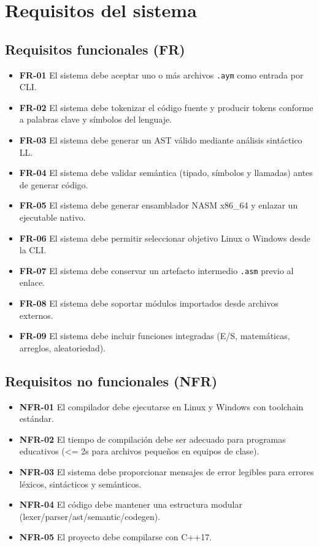 \documentclass[11pt,a4paper]{article}
\begin{document}
\section{Requisitos del sistema}

\subsection{Requisitos funcionales (FR)}
\begin{itemize}
    \item \textbf{FR-01} El sistema debe aceptar uno o más archivos \texttt{.aym} como entrada por CLI.
    \item \textbf{FR-02} El sistema debe tokenizar el código fuente y producir tokens conforme a palabras clave y símbolos del lenguaje.
    \item \textbf{FR-03} El sistema debe generar un AST válido mediante análisis sintáctico LL.
    \item \textbf{FR-04} El sistema debe validar semántica (tipado, símbolos y llamadas) antes de generar código.
    \item \textbf{FR-05} El sistema debe generar ensamblador NASM x86\_64 y enlazar un ejecutable nativo.
    \item \textbf{FR-06} El sistema debe permitir seleccionar objetivo Linux o Windows desde la CLI.
    \item \textbf{FR-07} El sistema debe conservar un artefacto intermedio \texttt{.asm} previo al enlace.
    \item \textbf{FR-08} El sistema debe soportar módulos importados desde archivos externos.
    \item \textbf{FR-09} El sistema debe incluir funciones integradas (E/S, matemáticas, arreglos, aleatoriedad).
\end{itemize}

\subsection{Requisitos no funcionales (NFR)}
\begin{itemize}
    \item \textbf{NFR-01} El compilador debe ejecutarse en Linux y Windows con toolchain estándar.
    \item \textbf{NFR-02} El tiempo de compilación debe ser adecuado para programas educativos (\textless= 2s para archivos pequeños en equipos de clase).
    \item \textbf{NFR-03} El sistema debe proporcionar mensajes de error legibles para errores léxicos, sintácticos y semánticos.
    \item \textbf{NFR-04} El código debe mantener una estructura modular (lexer/parser/ast/semantic/codegen).
    \item \textbf{NFR-05} El proyecto debe compilarse con C++17.
\end{itemize}
\end{document}
